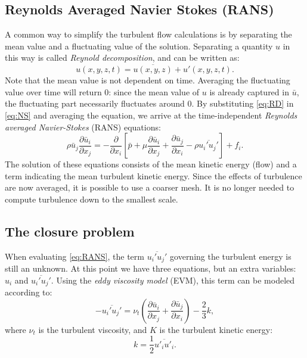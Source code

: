 \subsection{Reynolds Averaged Navier Stokes (RANS)}
A common way to simplify the turbulent flow calculations is by separating the mean value and a fluctuating value of the solution. Separating a quantity $u$ in this way is called \emph{Reynold decomposition}, and can be written as:
\begin{equation}\label{eq:RD}
u(x,y,z,t) = \overline{u(x,y,z)}+u'(x,y,z,t).
\end{equation}
Note that the mean value is not dependent on time. Averaging the fluctuating value over time will return 0: since the mean value of $u$ is already captured in $\bar{u}$, the fluctuating part necessarily fluctuates around 0. By substituting \autoref{eq:RD} in \autoref{eq:NS} and averaging the equation, we arrive at the time-independent \emph{Reynolds averaged Navier-Stokes} (RANS) equations:
\begin{equation}\label{eq:RANS}
\rho \bar{u}_j \frac{\partial \bar{u}_i}{\partial x_j} = -\frac{\partial}{\partial x_i} \left[ \bar{p} + \mu \frac{\partial \bar{u}_i}{\partial x_j} + \frac{\partial \bar{u}_j}{\partial x_i} - \rho \overline{u_i'u_j'}\right] + f_i. 
\end{equation} 
The solution of these equations consists of the mean kinetic energy (flow) and a term indicating the mean turbulent kinetic energy. Since the effects of turbulence are now averaged, it is possible to use a coarser mesh. It is no longer needed to compute turbulence down to the smallest scale. 

\subsection{The closure problem}
When evaluating \autoref{eq:RANS}, the term $\overline{u_i'u_j'}$ governing the turbulent energy is still an unknown. At this point we have three equations, but an extra variables: $u_i$ and $\overline{u_i'u_j'}$. Using the \emph{eddy viscosity model} (EVM), this term can be modeled according to:
\begin{equation}\label{eq:EVM}
-\overline{u_i'u_j'}=\nu_t\left(\frac{\partial \bar{u}_i}{\partial x_j} + \frac{\partial \bar{u}_j}{\partial x_i} \right) - \frac{2}{3}k,
\end{equation}
where $\nu_t$ is the turbulent viscosity, and $K$ is the turbulent kinetic energy:
\begin{equation}\label{eq:k}
k = \frac{1}{2}\overline{u'_iu'_i}.
\end{equation}

